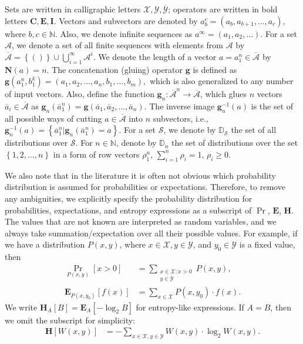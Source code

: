 \documentclass[journal, twocol]{IEEEtran}
\newcommand{\oa}{{\overline{a}}}
\newcommand{\mA}{{\mathcal{A}}}
\newcommand{\omA}{{\overline{\mathcal{A}}}}
\newcommand{\bfC}{{\mathbf{C}}}
\newcommand{\bD}{{\mathbb{D}}}
\newcommand{\bfE}{{\mathbf{E}}}
\newcommand{\bfH}{{\mathbf{H}}}
\newcommand{\bfI}{{\mathbf{I}}}
\newcommand{\bN}{{\mathbb{N}}}
\newcommand{\bfN}{{\mathbf{N}}}
\newcommand{\mS}{{\mathcal{S}}}
\newcommand{\mX}{{\mathcal{X}}}
\newcommand{\mY}{{\mathcal{Y}}}
\newcommand{\omY}{{\overline{\mathcal{Y}}}}
\newcommand{\set}[1]{{\left\{{#1}\right\}}}
\newcommand{\brsq}[1]{{\left[{#1}\right]}}
\newcommand{\bg}{\mathbf{g}}
\newcommand{\vc}[1]{\mathbf{#1}}
\begin{document}
Sets are written in calligraphic letters $\mX,\mY,\omY$; operators are written in bold letters $\bfC,\bfE,\bfI$.
Vectors and subvectors are denoted by $a_b^c=(a_b,a_{b+1},\dots,a_c)$, where $b,c\in\bN$.
Also, we denote infinite sequences as $a^\infty=(a_1,a_2,\dots)$.
For a set $\mA$, we denote a set of all finite sequences with elements from $\mA$ by
$
\omA=\set{()}\cup \bigcup_{i=1}^\infty \mA^i.
$
We denote the length of a vector $a=a_1^n\in\omA$ by $\bfN(a)=n$. The concatenation (gluing) operator $\bg$ is defined as 
$
\bg(a_1^n,b_1^k)=(a_1,a_2,...,a_n,b_1,...,b_m),
$
which is also generalized to any number of input vectors.
Also, define the function $\bg_n:\omA^n\to\omA$, which glues $n$ vectors $\oa_i\in\omA$ as
$
\bg_n(\oa_1^n)=\bg(\oa_1,\oa_2,...,\oa_n).
$
The inverse image $\bg^{-1}_n(a)$ is the set of all possible ways of cutting $a\in\omA$ into $n$ subvectors, i.e., $\bg^{-1}_n(a)=\set{\oa_1^n|\bg_n(\oa_1^n)=a}$.
For a set $\mS$, we denote by $\bD_\mS$ the set of all distributions over $\mS$.
For $n\in\bN$, denote by $\bD_n$ the set of distributions over the set $\set{1,2,\dots,n}$ in a form of row vectors $\rho_1^n$, $\sum_{i=1}^n\rho_i=1$, $\rho_i\geq 0$.


We also note that in the literature it is often not obvious which probability distribution is assumed for probabilities or expectations. Therefore, to remove any ambiguities, we explicitly specify the probability distribution for probabilities, expectations, and entropy expressions as a subscript of $\Pr$, $\bfE$, $\bfH$.
The values that are not known are interpreted as random variables, and we always take summation/expectation over all their possible values.
For example, if we have a distribution $P(x,y)$, where $x\in\mX,y\in\mY$, and $y_0 \in \mY$ is a fixed value, then
\begin{align}
\Pr_{P(x,y)}\brsq{x>0}&=\sum_{\substack{x\in\mX:x>0\\y\in\mY}}P(x,y), 
\label{eq:prex}
\\
\bfE_{P(x,y_0)}\brsq{f(x)}&=\sum_{x\in\mX}P(x,y_0)\cdot f(x).
\label{eq:eex}
\end{align}
We write $\bfH_A\brsq{B}=\bfE_A\brsq{-\log_2B}$ for entropy-like expressions.
If $A=B$, then we omit the subscript for simplicity:
\begin{align}
\bfH\brsq{W(x,y)}
&=-\sum_{x\in\mX,y\in\mY}W(x,y)\cdot \log_2 W(x,y).
\label{eq:hex2}
\end{align}
\end{document}
